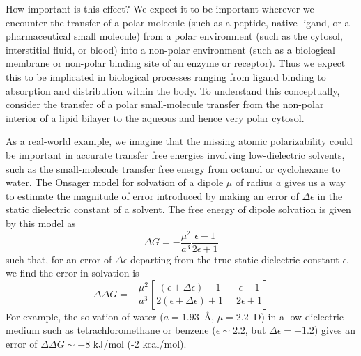 \documentclass[aip, jcp, reprint]{revtex4-1}  %
\begin{document}
How important is this effect?
We expect it to be important wherever we encounter the transfer of a polar molecule (such as a peptide, native ligand, or a pharmaceutical small molecule) from a polar environment (such as the cytosol, interstitial fluid, or blood) into a non-polar environment (such as a biological membrane or non-polar binding site of an enzyme or receptor). Thus we expect this to be implicated in biological processes ranging from ligand binding to absorption and distribution within the body. To understand this conceptually, consider the transfer of a polar small-molecule transfer from the non-polar interior of a lipid bilayer to the aqueous and hence very polar cytosol.

As a real-world example, we imagine that the missing atomic polarizability could be important in accurate transfer free energies involving low-dielectric solvents, such as the small-molecule transfer free energy from octanol or cyclohexane to water.  
The Onsager model for solvation of a dipole $\mu$ of radius $a$ gives us a way to estimate the magnitude of error introduced by making an error of $\Delta \epsilon$ in the static dielectric constant of a solvent.
The free energy of dipole solvation is given by this model as
\begin{equation} \label{eq:onsager}
\Delta G = -\frac{\mu^2}{a^3}\frac{\epsilon - 1}{2 \epsilon + 1}
\end{equation}
such that, for an error of $\Delta \epsilon$ departing from the true static dielectric constant $\epsilon$, we find the error in solvation is
\begin{equation} \label{equation:onsager-error}
\Delta \Delta G = -\frac{\mu^2}{a^3} \left[ \frac{(\epsilon+\Delta \epsilon) - 1}{2 (\epsilon+\Delta \epsilon) + 1} - \frac{\epsilon - 1}{2 \epsilon + 1} \right] 
\end{equation}
For example, the solvation of water ($a = 1.93$~\AA, $\mu = 2.2$~D) in a low dielectric medium such as tetrachloromethane or benzene ($\epsilon \sim 2.2$, but $\Delta \epsilon = -1.2$) gives an error of $\Delta \Delta G \sim -8$ kJ/mol (-2 kcal/mol).
\end{document}
